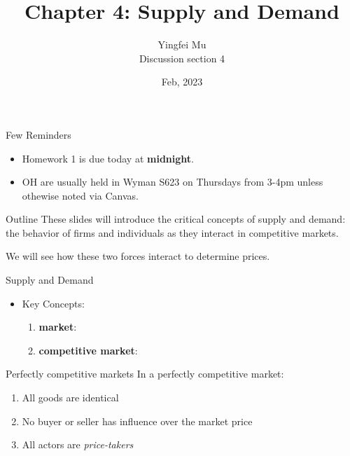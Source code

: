 \documentclass[aspectratio=169]{beamer}
\title{Chapter 4: Supply and Demand}
\author{Yingfei Mu \\
    Discussion section 4}
\date{Feb, 2023}
\begin{document}
\begin{frame}
    \titlepage 
\end{frame}

\begin{frame}{Few Reminders}
    \begin{itemize}
        \item Homework 1 is due today at \textbf{midnight}.
        \vspace{5mm}
        \item OH are usually held in Wyman S623 on Thursdays from 3-4pm unless othewise noted via Canvas.
    \end{itemize}
\end{frame}

\begin{frame}{Outline}
    These slides will introduce the critical concepts of supply and demand: the behavior of firms and individuals as they interact in competitive markets.
    
    \medskip

    We will see how these two forces interact to determine prices.
\end{frame}

\begin{frame}{Supply and Demand}
    \begin{itemize}
        \item Key Concepts:
        \vspace{5mm}
        \begin{enumerate}
            \item<1-> \textbf{market}: 
            \vspace{5mm}
            \item<3-> \textbf{competitive market}: 
        \end{enumerate}
    \end{itemize}
    
\end{frame}

\begin{frame}{Perfectly competitive markets}
    In a perfectly competitive market:
    \begin{enumerate}
        \item All goods are identical
        \item No buyer or seller has influence over the market price
        \item All actors are \textit{price-takers}
    \end{enumerate}
\end{frame}
\end{document}
